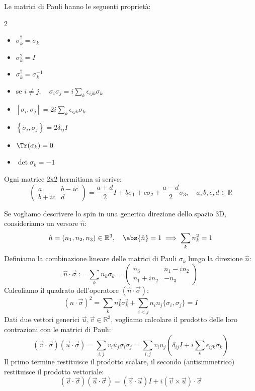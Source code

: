 Le matrici di Pauli hanno le seguenti proprietà:
\begin{multicols}{2}
\begin{itemize}
    \item \(\sigma_k^\dagger = \sigma_k\)
    \item \(\sigma_k^2= I\)
    \item \(\sigma_k^\dagger = \sigma_k^{-1}\)
    \item se \(i \neq j, \quad \sigma_i\sigma_j=i \sum_{k}\epsilon_{ijk}\sigma_k\)
    \item \(\left[ \sigma_i, \sigma_j \right]=2i\sum_k\epsilon_{ijk}\sigma_k\)
    \item \(\left\{ \sigma_i,\sigma_j \right\}= 2\delta_{ij}I\)
    \item \(\Tr(\sigma_k)=0\)
    \item \(\det\sigma_k= -1\)
\end{itemize}    
\end{multicols}

Ogni matrice 2x2 hermitiana si scrive:
\[
    \begin{pmatrix}
        a & b-ic \\
        b+ic & d
    \end{pmatrix}
    = \frac{a+d}{2} I + b \sigma_1 + c \sigma_2 + \frac{a-d}{2} \sigma_3, \quad a,b,c,d \in \mathbb{R}
\]


Se vogliamo descrivere lo spin in una generica direzione dello spazio 3D, consideriamo un versore $\hat{n}$:
\[
\hat{n} = (n_1, n_2, n_3) \in \mathbb{R}^3, \quad \abs{\hat{n}}=1 \implies \sum_k n_k^2 = 1
\]
Definiamo la combinazione lineare delle matrici di Pauli $\sigma_k$ lungo la direzione $\hat{n}$:
\begin{equation}
    \hat{n} \cdot \vec{\sigma} := \sum_k n_k \sigma_k =
    \begin{pmatrix}
    n_3 & n_1 - i n_2 \\
    n_1 + i n_2 & -n_3
    \end{pmatrix}
\end{equation}
Calcoliamo il quadrato dell'operatore $(\hat{n} \cdot \vec{\sigma})$:
\[
(\hat{n} \cdot \vec{\sigma})^2 = \sum_{k} n_k^2 \sigma_k^2+ \sum_{i < j} n_i n_j \{\sigma_i, \sigma_j\}=I
\]
Dati due vettori generici $\vec{u}, \vec{v} \in \mathbb{R}^3$, vogliamo calcolare il prodotto delle loro contrazioni con le matrici di Pauli:
\[
(\vec{v} \cdot \vec{\sigma})(\vec{u} \cdot \vec{\sigma}) = \sum_{i,j} v_i u_j \sigma_i \sigma_j = \sum_{i,j} v_i u_j \left(\delta_{ij}I + i \sum_k \epsilon_{ijk}\sigma_k\right)
\]
Il primo termine restituisce il prodotto scalare, il secondo (antisimmetrico) restituisce il prodotto vettoriale:
\begin{equation}
(\vec{v} \cdot \vec{\sigma})(\vec{u} \cdot \vec{\sigma}) = (\vec{v} \cdot \vec{u}) I + i (\vec{v} \times \vec{u}) \cdot \vec{\sigma}
\end{equation}



